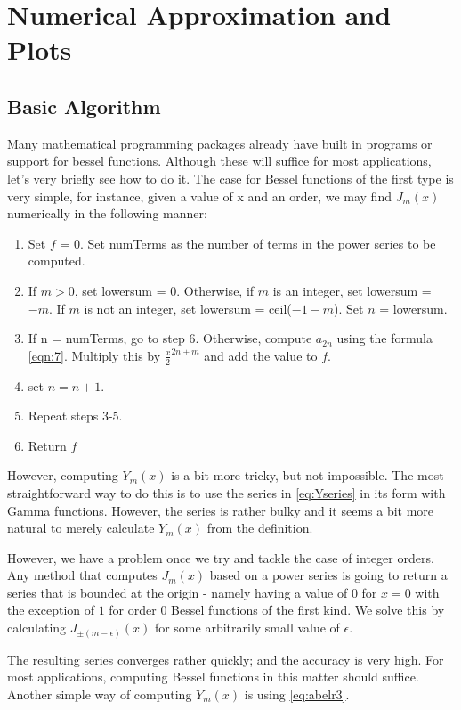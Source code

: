 \documentclass[]{article}
\begin{document}
\section{Numerical Approximation and Plots}
\subsection{Basic Algorithm}
Many mathematical programming packages already have built in programs or support for bessel functions. Although these will suffice for most applications, let's very briefly see how to do it. The case for Bessel functions of the first type is very simple, for instance, given a value of x and an order, we may find $J_m(x)$ numerically in the following manner:
\begin{enumerate}
	\item Set $f$ = 0. Set numTerms as the number of terms in the power series to be computed.
	\item If $m >0$, set lowersum = 0. Otherwise, if $m$ is an integer, set lowersum = $-m$. If $m$ is not an integer, set lowersum = ceil($-1-m$). Set $n$ = lowersum.
	\item If n = numTerms, go to step 6. Otherwise, compute $a_{2n}$ using the formula \eqref{eqn:7}. Multiply this by $\frac{x}{2}^{2n+m}$ and add the value to $f$. 
	\item set $n = n + 1$.
	\item Repeat steps 3-5.
	\item Return $f$
\end{enumerate}
However, computing $Y_m(x)$ is a bit more tricky, but not impossible. The most straightforward way to do this is to use the series in \eqref{eq:Yseries} in its form with Gamma functions. However, the series is rather bulky and it seems a bit more natural to merely calculate $Y_m(x)$ from the definition. 

However, we have a problem once we try and tackle the case of integer orders. Any method that computes $J_m(x)$ based on a power series is going to return a series that is bounded at the origin - namely having a value of $0$ for $x = 0$ with the exception of $1$ for order 0 Bessel functions of the first kind. We solve this by calculating $J_{\pm(m-\epsilon)}(x)$ for some arbitrarily small value of $\epsilon$. 

The resulting series converges rather quickly; and the accuracy is very high. For most applications, computing Bessel functions in this matter should suffice. Another simple way of computing $Y_m(x)$ is using \eqref{eq:abelr3}.
\end{document}
